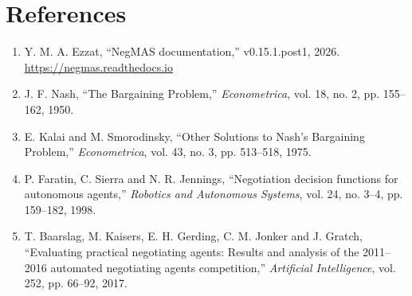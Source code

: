 \documentclass[11pt]{article}
\begin{document}
\section*{References}
\begin{enumerate}[leftmargin=1.5em]
    \item Y. M. A. Ezzat, ``NegMAS documentation,'' v0.15.1.post1, 2026. \url{https://negmas.readthedocs.io}
    \item J. F. Nash, ``The Bargaining Problem,'' \emph{Econometrica}, vol. 18, no. 2, pp. 155--162, 1950.
    \item E. Kalai and M. Smorodinsky, ``Other Solutions to Nash's Bargaining Problem,'' \emph{Econometrica}, vol. 43, no. 3, pp. 513--518, 1975.
    \item P. Faratin, C. Sierra and N. R. Jennings, ``Negotiation decision functions for autonomous agents,'' \emph{Robotics and Autonomous Systems}, vol. 24, no. 3--4, pp. 159--182, 1998.
    \item T. Baarslag, M. Kaisers, E. H. Gerding, C. M. Jonker and J. Gratch, ``Evaluating practical negotiating agents: Results and analysis of the 2011--2016 automated negotiating agents competition,'' \emph{Artificial Intelligence}, vol. 252, pp. 66--92, 2017.
\end{enumerate}
\end{document}
